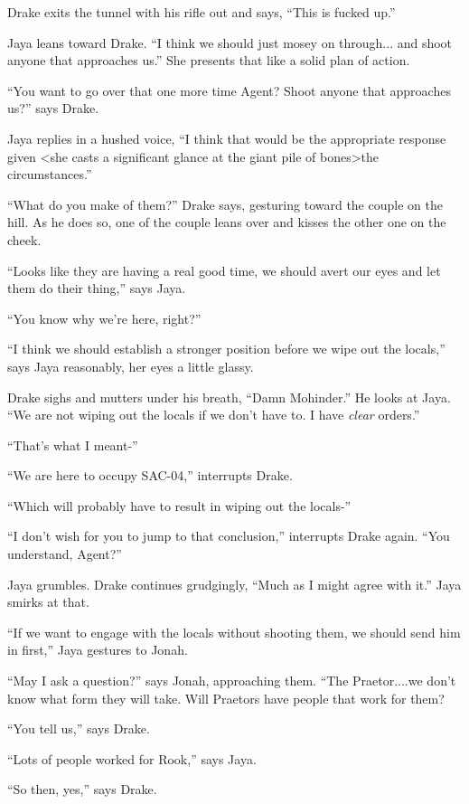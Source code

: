 Drake exits the tunnel with his rifle out and says, ``This is fucked up.''

Jaya leans toward Drake.  ``I think we should just mosey on through... and shoot anyone that approaches us.''  She presents that like a solid plan of action.

``You want to go over that one more time Agent?  Shoot anyone that approaches us?'' says Drake.

Jaya replies in a hushed voice, ``I think that would be the appropriate response given \textless she casts a significant glance at the giant pile of bones\textgreater  the circumstances.''

``What do you make of them?'' Drake says, gesturing toward the couple on the hill.  As he does so, one of the couple leans over and kisses the other one on the cheek.

``Looks like they are having a real good time, we should avert our eyes and let them do their thing,'' says Jaya.

``You know why we're here, right?''

``I think we should establish a stronger position before we wipe out the locals,'' says Jaya reasonably, her eyes a little glassy.

Drake sighs and mutters under his breath, ``Damn Mohinder.''  He looks at Jaya.  ``We are not wiping out the locals if we don't have to.  I have \textit{clear} orders.''

``That's what I meant-''

``We are here to occupy SAC-04,'' interrupts Drake.

``Which will probably have to result in wiping out the locals-''

``I don't wish for you to jump to that conclusion,'' interrupts Drake again.  ``You understand, Agent?''

Jaya grumbles.  Drake continues grudgingly, ``Much as I might agree with it.''  Jaya smirks at that.

``If we want to engage with the locals without shooting them, we should send him in first,'' Jaya gestures to Jonah.

``May I ask a question?'' says Jonah, approaching them.  ``The Praetor....we don't know what form they will take.  Will Praetors have people that work for them?

``You tell us,'' says Drake.

``Lots of people worked for Rook,'' says Jaya.

``So then, yes,'' says Drake.

